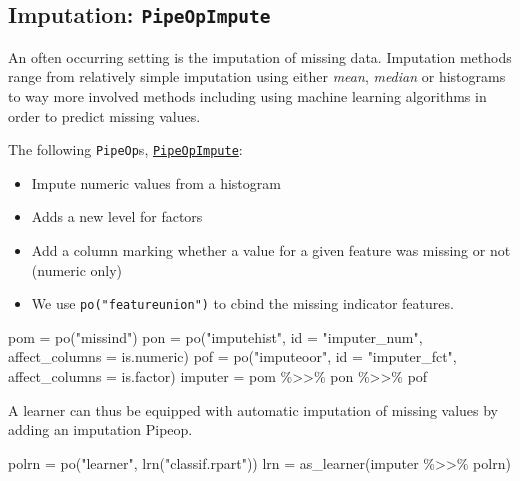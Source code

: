 \documentclass[
]{scrbook}
\newenvironment{Shaded}{\begin{snugshade}}{\end{snugshade}}
\newcommand{\AttributeTok}[1]{\textcolor[rgb]{0.77,0.63,0.00}{#1}}
\newcommand{\FunctionTok}[1]{\textcolor[rgb]{0.00,0.00,0.00}{#1}}
\newcommand{\NormalTok}[1]{#1}
\newcommand{\OtherTok}[1]{\textcolor[rgb]{0.56,0.35,0.01}{#1}}
\newcommand{\SpecialCharTok}[1]{\textcolor[rgb]{0.00,0.00,0.00}{#1}}
\newcommand{\StringTok}[1]{\textcolor[rgb]{0.31,0.60,0.02}{#1}}
\providecommand{\tightlist}{%
  \setlength{\itemsep}{0pt}\setlength{\parskip}{0pt}}
\renewenvironment{Shaded} {\begin{snugshade}\small} {\end{snugshade}}
\begin{document}
\hypertarget{imputation-pipeopimpute}{%
\subsection{\texorpdfstring{Imputation: \texttt{PipeOpImpute}}{Imputation: PipeOpImpute}}\label{imputation-pipeopimpute}}

An often occurring setting is the imputation of missing data.
Imputation methods range from relatively simple imputation using either \emph{mean}, \emph{median} or histograms to way more involved methods including using machine learning algorithms in order to predict missing values.

The following \texttt{PipeOp}s, \href{https://mlr3pipelines.mlr-org.com/reference/PipeOpImpute.html}{\texttt{PipeOpImpute}}:

\begin{itemize}
\tightlist
\item
  Impute numeric values from a histogram
\item
  Adds a new level for factors
\item
  Add a column marking whether a value for a given feature was missing or not (numeric only)
\item
  We use \texttt{po("featureunion")} to cbind the missing indicator features.
\end{itemize}

\begin{Shaded}
\begin{Highlighting}[]
\NormalTok{pom }\OtherTok{=} \FunctionTok{po}\NormalTok{(}\StringTok{"missind"}\NormalTok{)}
\NormalTok{pon }\OtherTok{=} \FunctionTok{po}\NormalTok{(}\StringTok{"imputehist"}\NormalTok{, }\AttributeTok{id =} \StringTok{"imputer\_num"}\NormalTok{, }\AttributeTok{affect\_columns =}\NormalTok{ is.numeric)}
\NormalTok{pof }\OtherTok{=} \FunctionTok{po}\NormalTok{(}\StringTok{"imputeoor"}\NormalTok{, }\AttributeTok{id =} \StringTok{"imputer\_fct"}\NormalTok{, }\AttributeTok{affect\_columns =}\NormalTok{ is.factor)}
\NormalTok{imputer }\OtherTok{=}\NormalTok{ pom }\SpecialCharTok{\%\textgreater{}\textgreater{}\%}\NormalTok{ pon }\SpecialCharTok{\%\textgreater{}\textgreater{}\%}\NormalTok{ pof}
\end{Highlighting}
\end{Shaded}

A learner can thus be equipped with automatic imputation of missing values by adding an imputation Pipeop.

\begin{Shaded}
\begin{Highlighting}[]
\NormalTok{polrn }\OtherTok{=} \FunctionTok{po}\NormalTok{(}\StringTok{"learner"}\NormalTok{, }\FunctionTok{lrn}\NormalTok{(}\StringTok{"classif.rpart"}\NormalTok{))}
\NormalTok{lrn }\OtherTok{=} \FunctionTok{as\_learner}\NormalTok{(imputer }\SpecialCharTok{\%\textgreater{}\textgreater{}\%}\NormalTok{ polrn)}
\end{Highlighting}
\end{Shaded}
\end{document}
